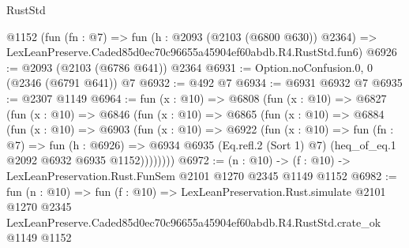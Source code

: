 \begin{lexlean}{RustStd}
\begin{coremodule}
    @1152
    (fun (fn : @7) =>
    fun (h : @2093 (@2103 (@6800 @630)) @2364) =>
    LexLeanPreserve.Caded85d0ec70c96655a45904ef60abdb.R4.RustStd.fun6)
@6926 := @2093 (@2103 (@6786 @641)) @2364
@6931 := Option.noConfusion.{0, 0} (@2346 (@6791 @641)) @7
@6932 := @492 @7
@6934 := @6931 @6932 @7
@6935 := @2307 @1149
@6964 := fun (x : @10) =>
  @6808
    (fun (x : @10) =>
    @6827
      (fun (x : @10) =>
      @6846
        (fun (x : @10) =>
        @6865
          (fun (x : @10) =>
          @6884
            (fun (x : @10) =>
            @6903
              (fun (x : @10) =>
              @6922
                (fun (x : @10) =>
                fun (fn : @7) =>
                fun (h : @6926) =>
                @6934 @6935 (Eq.refl.{2} (Sort 1) @7) (heq_of_eq.{1} @2092 @6932 @6935 @1152))))))))
@6972 := (n : @10) -> (f : @10) -> LexLeanPreservation.Rust.FunSem @2101 @1270 @2345 @1149 @1152
@6982 := fun (n : @10) =>
  fun (f : @10) =>
  LexLeanPreservation.Rust.simulate
    @2101
    @1270
    @2345
    LexLeanPreserve.Caded85d0ec70c96655a45904ef60abdb.R4.RustStd.crate_ok
    @1149
    @1152
\end{coremodule}
\end{lexlean}
